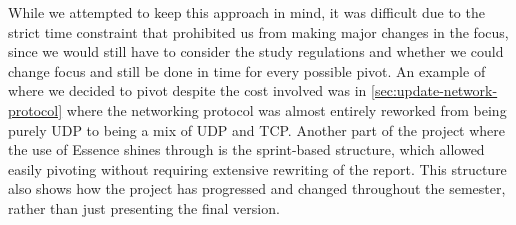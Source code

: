 While we attempted to keep this approach in mind, it was difficult due to the strict time constraint that prohibited us from making major changes in the focus, since we would still have to consider the study regulations and whether we could change focus and still be done in time for every possible pivot.
An example of where we decided to pivot despite the cost involved was in \autoref{sec:update-network-protocol} where the networking protocol was almost entirely reworked from being purely UDP to being a mix of UDP and TCP.
Another part of the project where the use of Essence shines through is the sprint-based structure, which allowed easily pivoting without requiring extensive rewriting of the report.
This structure also shows how the project has progressed and changed throughout the semester, rather than just presenting the final version.
